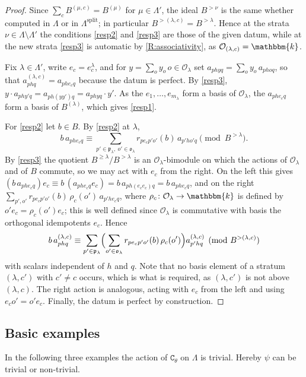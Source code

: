 \documentclass[a4paper,11pt]{amsart}
\numberwithin{equation}{subsection}
\theoremstyle{definition}
\theoremstyle{theorem}
\theoremstyle{remark}
\newcommand\CO{\mathcal{O}}
\newcommand\plam[1][\lambda]{\mathfrak{p}_{#1}}
\newcommand\Olam[1][\lambda]{\CO_{#1}}
\newcommand\olam[1][\lambda]{\mathfrak{o}_{#1}}
\newcommand\op{\operatorname}
\newcommand\kk{\mathbbm{k}}
\begin{document}
\begin{proof}
  Since $\sum_{c}B^{(\mu,c)}=B^{(\mu)}$ for $\mu\in\Lambda'$, the ideal $B^{>\nu}$ is the same
  whether computed in $\Lambda$ or in $\Lambda^{\op{split}}$; in particular
  $B^{>(\lambda,c)}=B^{>\lambda}$. Hence at the strata $\nu\in\Lambda\setminus\Lambda'$ the
  conditions \autoref{resp2} and \autoref{resp3} are those of the given datum, while at the new
  strata \autoref{resp3} is automatic by \autoref{R:associativity}, as
  $\Olam[(\lambda,c)]=\kk$.

  Fix $\lambda\in\Lambda'$, write $e_c=e^{\lambda}_c$, and for $y=\sum_oy_o\,o\in\Olam$ set
  $a_{phyq}=\sum_oy_o\,a_{phoq}$, so that $a^{(\lambda,c)}_{phq}=a_{phe_cq}$ because the datum
  is perfect. By \autoref{resp3}, $y\cdot a_{phy'q}=a_{ph(yy')q}=a_{phyq}\cdot y'$. As the
  $e_1,\dots,e_{m_\lambda}$ form a basis of $\Olam$, the $a_{phe_cq}$ form a basis of
  $B^{(\lambda)}$, which gives \autoref{resp1}.

  For \autoref{resp2} let $b\in B$. By \autoref{resp2} at $\lambda$,
  \[
    b\,a_{phe_cq}\equiv\sum_{p'\in\plam,\ o'\in\olam}r_{pe_cp'o'}(b)\,a_{p'ho'q}
    \pmod{B^{>\lambda}} .
  \]
  By \autoref{resp3} the quotient $B^{\ge\lambda}/B^{>\lambda}$ is an $\Olam$-bimodule on which
  the actions of $\Olam$ and of $B$ commute, so we may act with $e_c$ from the right. On the
  left this gives $(b\,a_{phe_cq})e_c\equiv b\,(a_{phe_cq}e_c)=b\,a_{ph(e_ce_c)q}
  =b\,a_{phe_cq}$, and on the right
  $\sum_{p',o'}r_{pe_cp'o'}(b)\,\rho_c(o')\,a_{p'he_cq}$, where $\rho_c\colon\Olam\to\kk$ is
  defined by $o'e_c=\rho_c(o')e_c$; this is well defined since $\Olam$ is commutative with
  basis the orthogonal idempotents $e_c$. Hence
  \[
    b\,a^{(\lambda,c)}_{phq}\equiv\sum_{p'\in\plam}
      \Bigl(\sum_{o'\in\olam}r_{pe_cp'o'}(b)\,\rho_c(o')\Bigr)a^{(\lambda,c)}_{p'hq}
    \pmod{B^{>(\lambda,c)}}
  \]
  with scalars independent of $h$ and $q$. Note that no basis element of a stratum
  $(\lambda,c')$ with $c'\ne c$ occurs, which is what is required, as $(\lambda,c')$ is not
  above $(\lambda,c)$. The right action is analogous, acting with $e_c$ from the left and using
  $e_co'=o'e_c$. Finally, the datum is perfect by construction.
\end{proof}

\subsection{Basic examples}
In the following three examples the action of $\mathtt{C}_\theta$ on $\Lambda$ is
trivial. Hereby $\psi$ can be  trivial or non-trivial.
\end{document}
